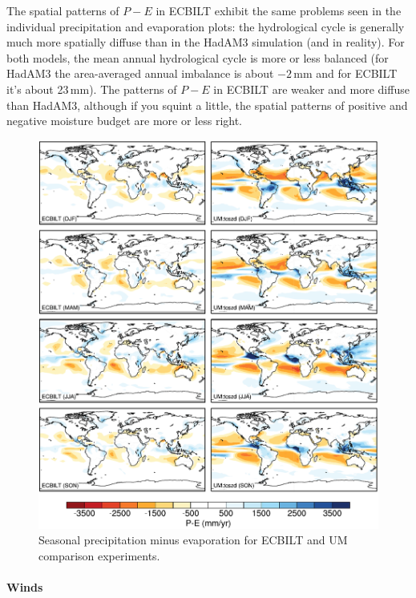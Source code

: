 \documentclass[a4paper,11pt,article]{article}
\begin{document}
The spatial patterns of $P-E$ in ECBILT exhibit the same problems seen
in the individual precipitation and evaporation plots: the
hydrological cycle is generally much more spatially diffuse than in
the HadAM3 simulation (and in reality).  For both models, the mean
annual hydrological cycle is more or less balanced (for HadAM3 the
area-averaged annual imbalance is about $-2$\,mm and for ECBILT it's
about 23\,mm).  The patterns of $P-E$ in ECBILT are weaker and more
diffuse than HadAM3, although if you squint a little, the spatial
patterns of positive and negative moisture budget are more or less
right.

\begin{figure}
  \begin{center}
    \includegraphics[width=\textwidth]{control-expt-1/pmine-plots}
  \end{center}
  \caption{Seasonal precipitation minus evaporation for ECBILT and UM
    comparison experiments.}
  \label{fig:pmine}
\end{figure}

\paragraph{Winds}
\end{document}
